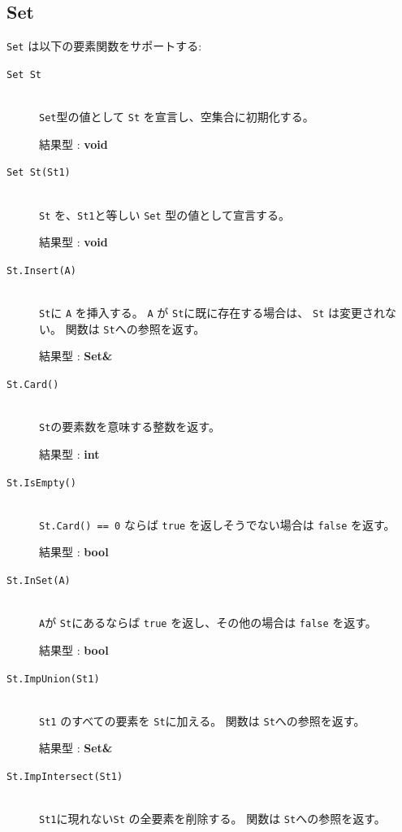 \documentclass[\pformat,12pt]{jarticle}
\begin{document}
\subsection{Set}
{\tt Set} は以下の要素関数をサポートする:

\vspace{0.5cm}

\begin{description}
\item[{\tt Set St}] \mbox{}\\
      {\tt Set}型の値として {\tt St} を宣言し、空集合に初期化する。

     結果型 : {\bf void}

\item[{\tt Set St(St1)}] \mbox{}\\
      {\tt St} を、{\tt St1}と等しい {\tt Set} 型の値として宣言する。

     結果型 : {\bf void}

\item[{\tt St.Insert(A)}] \mbox{}\\     
     {\tt St}に {\tt A} を挿入する。 
 {\tt A} が {\tt St}に既に存在する場合は、 {\tt St} は変更されない。
   関数は {\tt St}への参照を返す。

     結果型 : {\bf Set\&}

\item[{\tt St.Card()}] \mbox{}\\     
     {\tt St}の要素数を意味する整数を返す。

     結果型 : {\bf int}

\item[{\tt St.IsEmpty()}] \mbox{}\\
     {\tt St.Card() == 0} ならば {\tt true} を返しそうでない場合は {\tt false} を返す。

     結果型 : {\bf bool}
     
\item[{\tt St.InSet(A)}] \mbox{}\\     
      {\tt A}が {\tt St}にあるならば {\tt true} を返し、その他の場合は {\tt false} を返す。

     結果型 : {\bf bool}

\item[{\tt St.ImpUnion(St1)}] \mbox{}\\     
      {\tt St1} のすべての要素を {\tt St}に加える。
     関数は {\tt St}への参照を返す。

     結果型 : {\bf Set\&}

\item[{\tt St.ImpIntersect(St1)}] \mbox{}\\     
      {\tt St1}に現れない{\tt St} の全要素を削除する。
     関数は {\tt St}への参照を返す。


\end{description}
\end{document}
